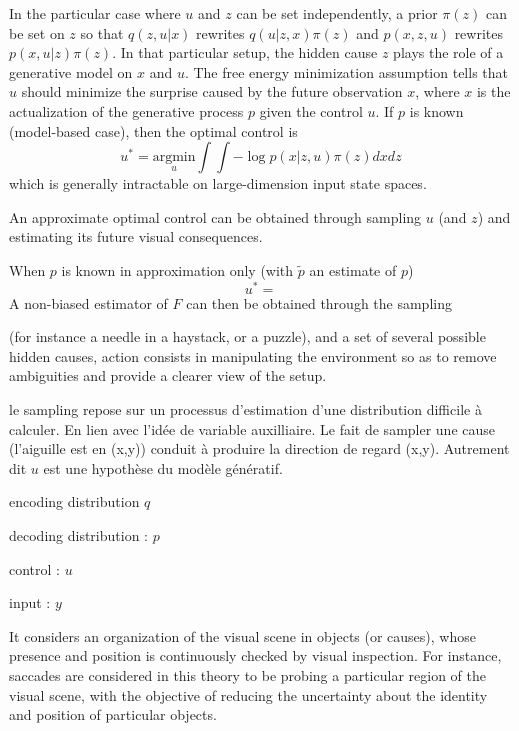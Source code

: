 \documentclass[12pt,twoside,openright]{article}
\begin{document}
{	In the particular case where $u$ and $z$ can be set independently, a prior $\pi(z)$ can be set on $z$ so that $q(z,u|x)$ rewrites $q(u|z,x)\pi(z)$ and $p(x, z, u)$ rewrites $p(x, u |z) \pi(z)$. In that particular setup, the hidden cause $z$ plays the role of a generative model on $x$ and $u$. The free energy minimization assumption tells that $u$ should minimize the surprise caused by the future observation $x$, where $x$ is the actualization of the generative process $p$ given the control $u$. 
	If $p$ is known (model-based case), then the optimal control is
	$$u^* = \underset{u}{\text{argmin}} \int \int - \log p(x|z, u) \pi(z) dx dz$$
	which is generally intractable on large-dimension input state spaces.
	
	An approximate optimal control can be obtained through sampling $u$ (and $z$) and estimating its future visual consequences.
	
	When $p$ is known in approximation only (with $\tilde{p}$ an estimate of $p$)
		$$u^* = $$ A non-biased estimator of $F$ can then be obtained through the sampling }
		

	
	(for instance a needle in a haystack, or a puzzle),  and a set of several possible hidden causes, action consists in manipulating the environment so as to remove ambiguities and provide a clearer view of the setup. 
	
	{\color{blue} le sampling repose sur un processus d'estimation d'une distribution difficile à calculer. En lien avec l'idée de variable auxilliaire. Le fait de sampler une cause (l'aiguille est en (x,y)) conduit à produire la direction de regard (x,y). Autrement dit $u$ est une hypothèse du modèle génératif. }
	
	encoding distribution $q$
	
	decoding distribution : $p$
	
	control : $u$
	
	input : $y$
	
	It considers an organization of the visual scene in objects (or causes), whose presence and position is continuously checked by visual inspection. For instance, saccades are considered in this theory to be probing a particular region of the visual scene, with the objective of reducing the uncertainty about the identity and position of particular objects. %
	
\end{document}
